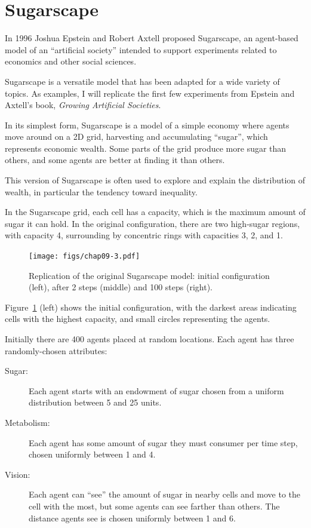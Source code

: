 \documentclass[12pt]{book}
\theoremstyle{exercise}
\newcommand{\py}{\verb}%}
\begin{document}
\section{Sugarscape}


In 1996 Joshua Epstein and Robert Axtell proposed Sugarscape, an
agent-based model of an ``artificial society'' intended to support
experiments related to economics and other social sciences.

Sugarscape is a versatile model that has been adapted for a wide
variety of topics.  As examples, I will replicate the
first few experiments from Epstein and Axtell's book, {\it Growing
Artificial Societies}.

In its simplest form, Sugarscape is a model of a simple economy where
agents move around on a 2D grid, harvesting and accumulating ``sugar'',
which represents economic wealth.  Some parts of the grid produce more
sugar than others, and some agents are better at finding it than
others.

This version of Sugarscape is often used to explore and explain the
distribution of wealth, in particular the tendency toward inequality.

In the Sugarscape grid, each cell has a capacity, which is the maximum
amount of sugar it can hold.  In the original configuration, there
are two high-sugar regions, with capacity 4, surrounding by concentric
rings with capacities 3, 2, and 1.

\begin{figure}
\centerline{\texttt{[image: figs/chap09-3.pdf]}}
\caption{Replication of the original Sugarscape model: initial
configuration (left), after 2 steps (middle) and 100 steps (right).}
\label{chap09-3}
\end{figure}

Figure~\ref{chap09-3} (left) shows the initial configuration, with the darkest
areas indicating cells with the highest capacity, and small circles
representing the agents.

Initially there are 400 agents placed at random locations.  Each
agent has three randomly-chosen attributes:

\begin{description}

\item[Sugar:] Each agent starts with an endowment of sugar chosen
from a uniform distribution between 5 and 25 units.

\item[Metabolism:] Each agent has some amount of sugar they must
consumer per time step, chosen uniformly between 1 and 4.

\item[Vision:] Each agent can ``see'' the amount
of sugar in nearby cells and move to the cell with the most, but
some agents can see farther than others.  The distance agents
see is chosen uniformly between 1 and 6.

\end{description}
\end{document}
